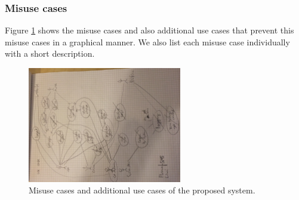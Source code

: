 \documentclass[a4paper, toc=index, 12pt, DIV14, twoside, BCOR2cm, headsepline, numbers=noenddot, bibliography=totoc]{scrbook}
\begin{document}
\subsubsection{Misuse cases}
Figure \ref{misusecase} shows the misuse cases and also additional use cases that prevent this misuse cases in a graphical manner. We also list each misuse case individually with a short description.
\begin{figure}[H]
  \centering
    \includegraphics[width=0.6\textwidth]{images/misusecase.jpg}  
  \caption{Misuse cases and additional use cases of the proposed system.}
  \label{misusecase}
\end{figure}
\end{document}
